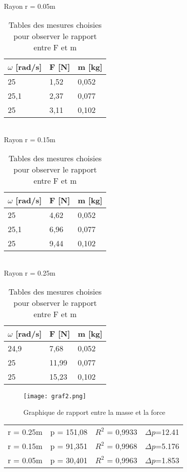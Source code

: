 \begin{table}[ht]
    \centering
    \caption[Tables mesures masse force]{Tables des mesures choisies pour observer le rapport entre F et m}

    Rayon r = 0.05m\\[1px]
    \begin{tabular}{|l|l|l|}
    \hline
	$\omega$ [rad/s] &F [N]	&m [kg]	\\
    \hline
	25	&1,52	&0,052 \\
	25,1	&2,37	&0,077 \\
	25	&3,11	&0,102 \\
    \hline
    \end{tabular}\\[5px]

    Rayon r = 0.15m\\[1px]
    \begin{tabular}{|l|l|l|}
    \hline
	$\omega$ [rad/s] &F [N]	&m [kg]	\\
    \hline
	25	&4,62	&0,052 \\
	25,1	&6,96	&0,077 \\
	25	&9,44	&0,102 \\
    \hline
    \end{tabular}\\[5px]

    Rayon r = 0.25m\\[1px]
    \begin{tabular}{|l|l|l|}
    \hline
	$\omega$ [rad/s] &F [N]	&m [kg]	\\
    \hline
	24,9	&7,68	&0,052 \\
	25	&11,99	&0,077 \\
	25	&15,23	&0,102 \\
    \hline
    \end{tabular}
\end{table}

\begin{figure}[!h]
    \caption[Graphique masse force]{Graphique de rapport entre la masse et la force}
    \centering
    \texttt{[image: graf2.png]}
\end{figure}

\begin{table}[ht]
    \centering
    \begin{tabular}{l l l l}
    r = 0.25m & p = 151,08& $R^2$ = 0,9933 & $\Delta p$=12.41\\
    r = 0.15m & p = 91,351& $R^2$ = 0,9968 & $\Delta p$=5.176\\
    r = 0.05m & p = 30,401& $R^2$ = 0,9963 & $\Delta p$=1.853\\
    \end{tabular}
\end{table}

